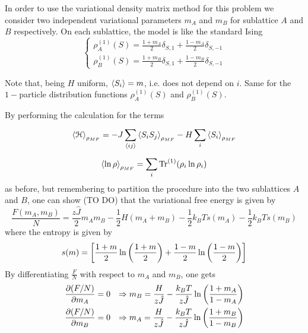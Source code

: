 \documentclass[../main/main.tex]{subfiles}
\begin{document}
\begin{example}
\begin{itemize}
In order to use the variational density matrix method for this problem we consider two independent variational parameters \( m_A \) and \( m_B \) for sublattice \( A \) and \( B \) respectively. On each sublattice, the model is like the standard Ising
\begin{equation}
  \begin{cases}
   \rho _A^{(1)}(S) = \frac{1+m_A}{2} \delta _{S,1}+ \frac{1-m_A}{2}\delta _{S,-1}\\
   \rho _B^{(1)}(S) = \frac{1+m_B}{2} \delta _{S,1}+ \frac{1-m_B}{2}\delta _{S,-1}
  \end{cases}
\end{equation}
\begin{remark}
Note that, being \( H \) uniform, \( \expval{S_i} = m \), i.e. does not depend on \( i \). Same for the \( 1- \)particle distribution functions \( \rho _A^{(1)}(S) \) and  \( \rho _B^{(1)}(S) \).
\end{remark}
By performing the calculation for the terms
\begin{equation}
  \expval{\mathcal{H}}_{\rho _{MF}} = - J \sum_{\expval{ij} }^{} \expval{S_i S_j}_{\rho _{MF}} - H \sum_{i}^{} \expval{S_i}_{\rho _{MF}}
\end{equation}
\begin{equation}
  \expval{\ln{\rho } }_{\rho _{MF}} = \sum_{i}^{} \Tr^{(1)}(\rho _i \ln{\rho _i} )
\end{equation}
as before, but remembering to partition the procedure into the two sublattices \( A \) and \( B \), one can show (TO DO) that the variational free energy is given by
\begin{equation}
  \frac{F(m_A,m_B)}{N} = \frac{z \hat{J} }{2}m_A m_B - \frac{1}{2}H (m_A+m_B)
  - \frac{1}{2} k_B T s(m_A) - \frac{1}{2}k_B T s(m_B)
\end{equation}
where the entropy is given by
\begin{equation}
  s(m) = \qty[\frac{1+m}{2} \ln{\qty(\frac{1+m}{2}) } + \frac{1-m}{2} \ln{\qty(\frac{1-m}{2}) }  ]
\end{equation}
By differentiating \( \frac{F}{N} \) with respect to \( m_A \) and \( m_B \), one gets
\begin{subequations}
\begin{align}
   \pdv{(F/N)}{m_A} &= 0 & \Rightarrow m_B = \frac{H}{z \hat{J} } - \frac{k_B T}{z \hat{J} }\ln{\qty(\frac{1+m_A}{1-m_A}) } \\
   \pdv{(F/N)}{m_B} &= 0 & \Rightarrow m_A = \frac{H}{z \hat{J} } - \frac{k_B T}{z \hat{J} }\ln{\qty(\frac{1+m_B}{1-m_B}) }

\end{align}
\end{subequations}
\end{itemize}
\end{example}
\end{document}
